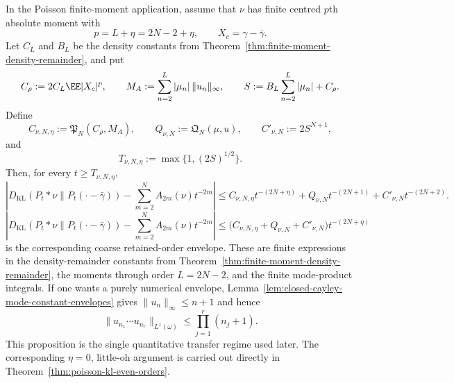 \begin{proposition}
In the Poisson finite-moment application, assume that \(\nu\) has finite
centred \(p\)th absolute moment with
\[
p=L+\eta=2N-2+\eta,\qquad X_c=\gamma-\bar{\gamma} .
\]
Let \(C_L\) and \(B_L\) be the density constants from
Theorem~\ref{thm:finite-moment-density-remainder}, and put
\[
C_\rho:=2C_L\EE|X_c|^p,\qquad
M_A:=\sum_{n=2}^{L}|\mu_n|\,\|u_n\|_\infty,\qquad
S:=B_L\sum_{n=2}^{L}|\mu_n|+C_\rho .
\]
Define
\[
C_{\nu,N,\eta}:=\mathfrak P_N(C_\rho,M_A),\qquad
Q_{\nu,N}:=\mathfrak Q_N(\mu,u),\qquad
C'_{\nu,N}:=2S^{N+1},
\]
and
\[
T_{\nu,N,\eta}:=\max\{1,(2S)^{1/2}\}.
\]
Then, for every \(t\ge T_{\nu,N,\eta}\),
\begin{equation}\label{eq:explicit-entropy-constant-bound}
\left|
D_{\mathrm{KL}}(P_t*\nu\|P_t(\cdot-\bar{\gamma}))
-\sum_{m=2}^{N}A_{2m}(\nu)t^{-2m}
\right|
\le
C_{\nu,N,\eta}t^{-(2N+\eta)}
+Q_{\nu,N}t^{-(2N+1)}
+C'_{\nu,N}t^{-(2N+2)} .
\end{equation}
\begin{equation}\label{eq:positive-margin-retained-order-theorem}
\left|
D_{\mathrm{KL}}(P_t*\nu\|P_t(\cdot-\bar{\gamma}))
-\sum_{m=2}^{N}A_{2m}(\nu)t^{-2m}
\right|
\le
\bigl(C_{\nu,N,\eta}+Q_{\nu,N}+C'_{\nu,N}\bigr)t^{-(2N+\eta)}
\end{equation}
is the corresponding coarse retained-order envelope.  These are finite
expressions in the density-remainder constants from
Theorem~\ref{thm:finite-moment-density-remainder}, the moments through order
\(L=2N-2\), and the finite mode-product integrals.  If one wants a purely
numerical envelope,
Lemma~\ref{lem:closed-cayley-mode-constant-envelopes} gives
$\|u_n\|_\infty\le n+1$ and hence
\[
\|u_{n_1}\cdots u_{n_r}\|_{L^1(\omega)}
\le\prod_{j=1}^{r}(n_j+1).
\]
This proposition is the single quantitative transfer regime used later.  The
corresponding \(\eta=0\), little-oh argument is carried out directly in
Theorem~\ref{thm:poisson-kl-even-orders}.
\end{proposition}

